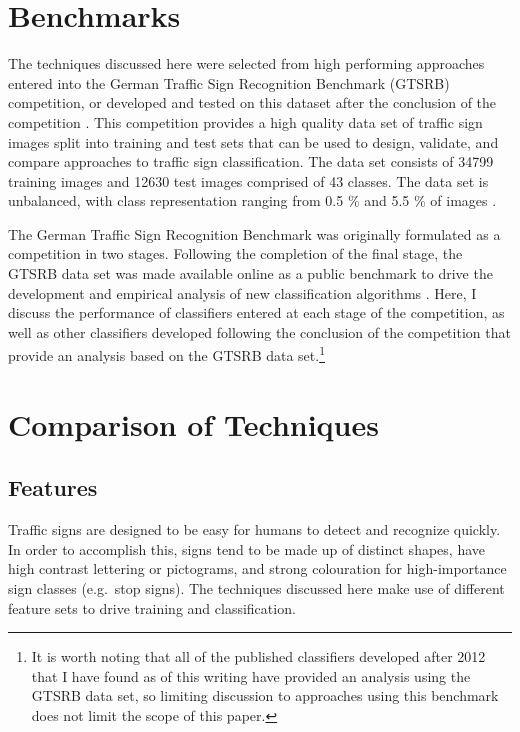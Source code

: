 \documentclass[letterpaper,twocolumn,10pt]{article}
\begin{document}
\section{Benchmarks}

The techniques discussed here were selected from high performing approaches entered into the German Traffic Sign Recognition Benchmark (GTSRB) competition, or developed and tested on this dataset after the conclusion of the competition \cite{stallkamp_german_2011, stallkamp_man_2012}. This competition provides a high quality data set of traffic sign images split into training and test sets that can be used to design, validate, and compare approaches to traffic sign classification. The data set consists of 34799 training images and 12630 test images comprised of 43 classes. The data set is unbalanced, with class representation ranging from 0.5 \% and 5.5 \% of images \cite{stallkamp_german_2011}.

The German Traffic Sign Recognition Benchmark was originally formulated as a competition in two stages. Following the completion of the final stage, the GTSRB data set was made available online as a public benchmark to drive the development and empirical analysis of new classification algorithms \cite{stallkamp_german_2011, stallkamp_man_2012}. Here, I discuss the performance of classifiers entered at each stage of the competition, as well as other classifiers developed following the conclusion of the competition that provide an analysis based on the GTSRB data set.\footnote{It is worth noting that all of the published classifiers developed after 2012 that I have found as of this writing have provided an analysis using the GTSRB data set, so limiting discussion to approaches using this benchmark does not limit the scope of this paper.} 

\section{Comparison of Techniques}

\subsection{Features}

Traffic signs are designed to be easy for humans to detect and recognize quickly. In order to accomplish this, signs tend to be made up of distinct shapes, have high contrast lettering or pictograms, and strong colouration for high-importance sign classes (e.g.\ stop signs). The techniques discussed here make use of different feature sets to drive training and classification. 
\end{document}
